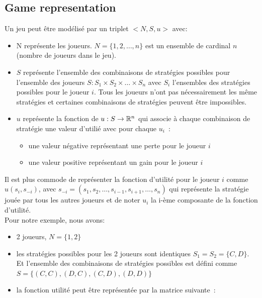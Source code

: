 \subsection{Game representation}

\begin{defn}
Un jeu peut \^etre mod\'elis\'e par un triplet $<N, S, u>$ avec:
\begin{itemize}
\item N repr\'esente les joueurs. $N = \{1,2,\ldots,n\}$ est un ensemble de cardinal $n$ (nombre de joueurs dans le jeu). 
\item $S$ repr\'esente l'ensemble des combinaisons de strat\'egies possibles pour l'ensemble des joueurs $S: S_1 \times S_2 \times \ldots \times S_n$ avec $S_i$ l'ensembles des strat\'egies possibles pour le joueur $i$. Tous les joueurs n'ont pas n\'ecessairement les m\^eme strat\'egies et certaines combinaisons de strat\'egies peuvent \^etre impossibles. 
\item $u$ repr\'esente la fonction de $u: S \to \mathbb{R}^n$ qui associe \`a chaque combinaison de strat\'egie une valeur d'utili\'e avec pour chaque $u_i$\ :
  \begin{itemize}
  \item une valeur n\'egative repr\'esentant une perte pour le joueur $i$
  \item une valeur positive repr\'esentant un gain pour le joueur $i$
  \end{itemize} 
\end{itemize}
\end{defn}

Il est plus commode de repr\'esenter la fonction d'utilit\'e pour le joueur $i$ comme $u(s_i, s_{-i})$, avec 
$s_{-i} = (s_1, s_2, \ldots, s_{i-1}, s_{i+1}, \ldots, s_n)$ qui repr\'esente la strat\'egie jou\'ee par tous les autres joueurs et de noter $u_i$ la i-\`eme composante de la fonction d'utilit\'e.
\\

Pour notre exemple, nous avons:
\begin{itemize}
\item 2 joueurs, $N = \{1,2\}$
\item les strat\'egies possibles pour les 2 joueurs sont identiques $S_1 = S_2 = \{C,D\}$. Et l'ensemble des combinaisons de strat\'egies possibles est d\'efini comme $S=\{(C,C),(D,C),(C,D),(D,D)\}$
\item la fonction utilit\'e peut \^etre repr\'esent\'ee par la matrice suivante\ :
\end{itemize} 

